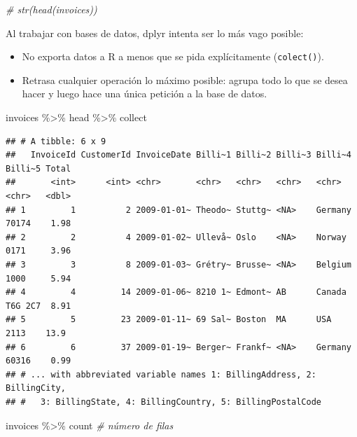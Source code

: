 \documentclass[
]{book}
\newenvironment{Shaded}{\begin{snugshade}}{\end{snugshade}}
\newcommand{\CommentTok}[1]{\textcolor[rgb]{0.56,0.35,0.01}{\textit{#1}}}
\newcommand{\NormalTok}[1]{#1}
\newcommand{\SpecialCharTok}[1]{\textcolor[rgb]{0.00,0.00,0.00}{#1}}
\theoremstyle{break}
\theoremstyle{nonumberplain}
\begin{document}
\begin{Shaded}
\begin{Highlighting}[]
\CommentTok{\# str(head(invoices))}
\end{Highlighting}
\end{Shaded}

Al trabajar con bases de datos, dplyr intenta ser lo más vago posible:

\begin{itemize}
\item
  No exporta datos a R a menos que se pida explícitamente (\texttt{colect()}).
\item
  Retrasa cualquier operación lo máximo posible:
  agrupa todo lo que se desea hacer y luego hace una única petición a la base de datos.
\end{itemize}

\begin{Shaded}
\begin{Highlighting}[]
\NormalTok{invoices }\SpecialCharTok{\%\textgreater{}\%}\NormalTok{ head }\SpecialCharTok{\%\textgreater{}\%}\NormalTok{ collect}
\end{Highlighting}
\end{Shaded}

\begin{verbatim}
## # A tibble: 6 x 9
##   InvoiceId CustomerId InvoiceDate Billi~1 Billi~2 Billi~3 Billi~4 Billi~5 Total
##       <int>      <int> <chr>       <chr>   <chr>   <chr>   <chr>   <chr>   <dbl>
## 1         1          2 2009-01-01~ Theodo~ Stuttg~ <NA>    Germany 70174    1.98
## 2         2          4 2009-01-02~ Ullevå~ Oslo    <NA>    Norway  0171     3.96
## 3         3          8 2009-01-03~ Grétry~ Brusse~ <NA>    Belgium 1000     5.94
## 4         4         14 2009-01-06~ 8210 1~ Edmont~ AB      Canada  T6G 2C7  8.91
## 5         5         23 2009-01-11~ 69 Sal~ Boston  MA      USA     2113    13.9 
## 6         6         37 2009-01-19~ Berger~ Frankf~ <NA>    Germany 60316    0.99
## # ... with abbreviated variable names 1: BillingAddress, 2: BillingCity,
## #   3: BillingState, 4: BillingCountry, 5: BillingPostalCode
\end{verbatim}

\begin{Shaded}
\begin{Highlighting}[]
\NormalTok{invoices }\SpecialCharTok{\%\textgreater{}\%}\NormalTok{ count }\CommentTok{\# número de filas}
\end{Highlighting}
\end{Shaded}
\end{document}
